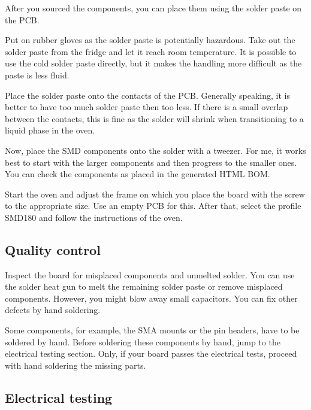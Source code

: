 After you sourced the components, you can place them using the solder paste on the PCB.

Put on rubber gloves as the solder paste is potentially hazardous. Take out the solder paste from the fridge and let it reach room temperature. It is possible to use the cold solder paste directly, but it makes the handling more difficult as the paste is less fluid.

Place the solder paste onto the contacts of the PCB. Generally speaking, it is better to have too much solder paste then too less. If there is a small overlap between the contacts, this is fine as the solder will shrink when transitioning to a liquid phase in the oven.

Now, place the SMD components onto the solder with a tweezer. For me, it works best to start with the larger components and then progress to the smaller ones. You can check the components as placed in the generated HTML BOM.


Start the oven and adjust the frame on which you place the board with the screw to the appropriate size. Use an empty PCB for this.
After that, select the profile SMD180 and follow the instructions of the oven.

\subsection{Quality control}

Inspect the board for misplaced components and unmelted solder. You can use the solder heat gun to melt the remaining solder paste or remove misplaced components. However, you might blow away small capacitors.
You can fix other defects by hand soldering.


Some components, for example, the SMA mounts or the pin headers, have to be soldered by hand. Before soldering these components by hand, jump to the electrical testing section. Only, if your board passes the electrical tests, proceed with hand soldering the missing parts.

\subsection{Electrical testing}

